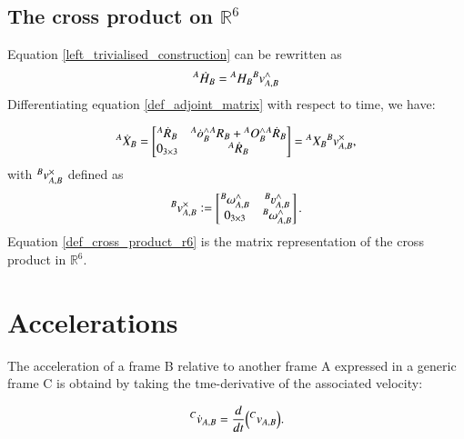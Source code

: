 \subsection{The cross product on $\mathbb{R}^6$}
Equation \ref{left_trivialised_construction} can be rewritten as
\begin{equation}
    {}^{A}{\dot{H}}_{B} = {}^{A}{H}_{B}{}^{B}{v}_{A,B}^{\wedge}
\end{equation}
Differentiating equation \ref{def_adjoint_matrix} with respect to time, we have:

\begin{equation} \label{def_adjoint_matrix_time_derivative}
    {}^{A}{\dot{X}}_{B} =
    \begin{bmatrix}
        {}^{A}{\dot{R}}_{B} & {}^{A}{\dot{o}}_{B}^{\wedge}{}^{A}{R}_{B} + {}^{A}{O}_{B}^{\wedge}{}^{A}{\dot{R}}_{B}\\
        0_{3\times 3} & {}^{A}{\dot{R}}_{B}
    \end{bmatrix} = {}^{A}{X}_{B} {}^{B}{v}_{A,B}^{\times},
\end{equation}
with ${}^{B}{v}_{A,B}^{\times}$ defined as
\begin{equation}\label{def_cross_product_r6}
    \leftsuperscript{B}{v}{A,B}^{\times} \defeq
    \begin{bmatrix}
    \wedged{\leftsuperscript{B}{\omega}{A,B}} & \wedged{\leftsuperscript{B}{\varv}{A,B}}\\
    0_{3\times 3} & \wedged{\leftsuperscript{B}{\omega}{A,B}}
    \end{bmatrix}.
\end{equation}
Equation \ref{def_cross_product_r6} is the matrix representation of the cross product in $\mathbb{R}^6$.


\section{Accelerations}
The acceleration of a frame B relative to another frame A expressed in a generic frame C is obtaind by taking the tme-derivative of the associated velocity:

\begin{equation}\label{def_frame_acceleration}
    {}^{C}{\dot{v}}_{A,B} = \frac{d}{dt} \Big({}^{C}{v}_{A,B} \Big).
\end{equation}

